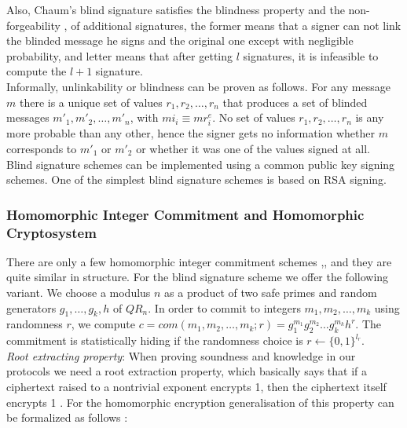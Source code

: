 \documentclass[12pt]{article}
\begin{document}
Also, Chaum's blind signature satisfies the blindness property \cite{Chaum1982} and the non-forgeability \cite{Pointcheval1996},\cite{Abstract1997} of additional signatures, the former means that a signer can not  link the blinded message he signs and the original one except with negligible probability, and letter means that after getting $l$ signatures, it is infeasible to compute the $l+1$ signature.\\

Informally, unlinkability or blindness can be proven as follows. For any message $m$  there is a unique set of values $r_1,r_2,\dots,r_n$ that produces a set of blinded messages $m'_1,m'_2,\dots,m'_n$, with $mi_i  \equiv mr_i^e$. No set of values $r_1,r_2,\dots,r_n$ is any more probable than any other, hence the signer gets no information whether $m$ corresponds to $m'_1$ or $m'_2$ or whether it was one of the values signed at all.\\

Blind signature schemes can be implemented using a common public key signing schemes. One of the simplest blind signature schemes is based on RSA signing. \subsubsection{Homomorphic Integer Commitment and Homomorphic Cryptosystem}
There are only a few homomorphic integer commitment schemes \cite{Eiichiro1997},\cite{Damg},\cite{Groth2005a} and they are quite similar in structure. For the blind signature scheme we offer the following variant.  We choose a modulus $n$ as a product of two safe primes and random generators $g_1, \dots, g_k,h$ of $QR_n$. In order to commit to integers $m_1,m_2, \dots, m_k$ using randomness $r$, we compute $c = com( m_1,m_2, \dots, m_k; r) = g_1^{m_1}g_2^{m_2}\dots g_k^{m_k}h^r$. The commitment is statistically hiding if the randomness choice is $r \leftarrow \{0,1\}^{l_r}$.\\

\textit{Root extracting property}: When proving soundness and knowledge in our protocols we need a root extraction property, which basically says that if a ciphertext raised to a nontrivial exponent encrypts 1, then the ciphertext itself encrypts 1 \cite{Groth2010}. For the homomorphic encryption generalisation of this property can be formalized as follows \cite{Groth2005}: \\

\\
\end{document}

